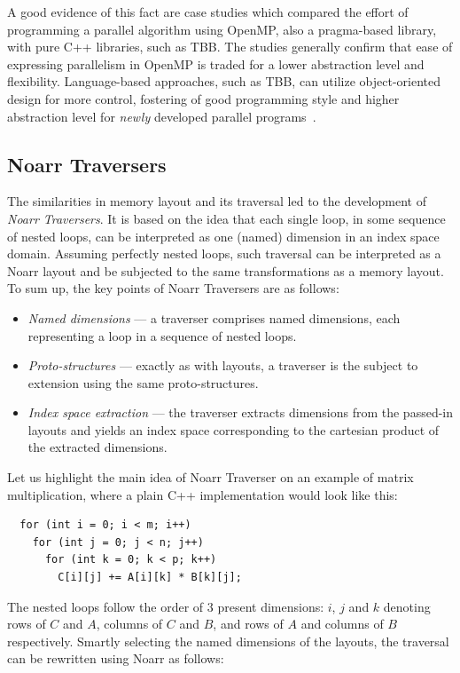 A good evidence of this fact are case studies which compared the effort of programming a parallel algorithm using OpenMP, also a pragma-based library, with pure C++ libraries, such as TBB. The studies generally confirm that ease of expressing parallelism in OpenMP is traded for a lower abstraction level and flexibility. Language-based approaches, such as TBB, can utilize object-oriented design for more control, fostering of good programming style and higher abstraction level for \emph{newly} developed parallel programs~\cite{kegel2009using,ajkunic2012comparison,refsnes2011comparison}.

\subsection{Noarr Traversers}

The similarities in memory layout and its traversal led to the development of \emph{Noarr Traversers}. It is based on the idea that each single loop, in some sequence of nested loops, can be interpreted as one (named) dimension in an index space domain. Assuming perfectly nested loops, such traversal can be interpreted as a Noarr layout and be subjected to the same transformations as a memory layout. To sum up, the key points of Noarr Traversers are as follows:
\begin{itemize}
  \item \emph{Named dimensions} --- a traverser comprises named dimensions, each representing a loop in a sequence of nested loops.
  \item \emph{Proto-structures} --- exactly as with layouts, a traverser is the subject to extension using the same proto-structures.
  \item \emph{Index space extraction} --- the traverser extracts dimensions from the passed-in layouts and yields an index space corresponding to the cartesian product of the extracted dimensions.
\end{itemize}

Let us highlight the main idea of Noarr Traverser on an example of matrix multiplication, where a plain C++ implementation would look like this:

\begin{verbatim}
  for (int i = 0; i < m; i++) 
    for (int j = 0; j < n; j++) 
      for (int k = 0; k < p; k++) 
        C[i][j] += A[i][k] * B[k][j];
\end{verbatim}
The nested loops follow the order of $3$ present dimensions: $i$, $j$ and $k$ denoting rows of $C$ and $A$, columns of $C$ and $B$, and rows of $A$ and columns of $B$ respectively. Smartly selecting the named dimensions of the layouts, the traversal can be rewritten using Noarr as follows:

